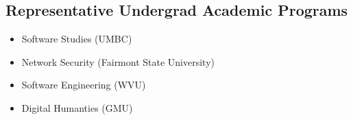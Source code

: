 \documentclass[letterpaper,10pt,english]{sphinxmanual}
\begin{document}
\subsection{Representative Undergrad Academic Programs}
\label{cybersecurity:representative-undergrad-academic-programs}\begin{itemize}
\item {} 
Software Studies (UMBC)

\item {} 
Network Security (Fairmont State University)

\item {} 
Software Engineering (WVU)

\item {} 
Digital Humanties (GMU)

\end{itemize}
\end{document}
